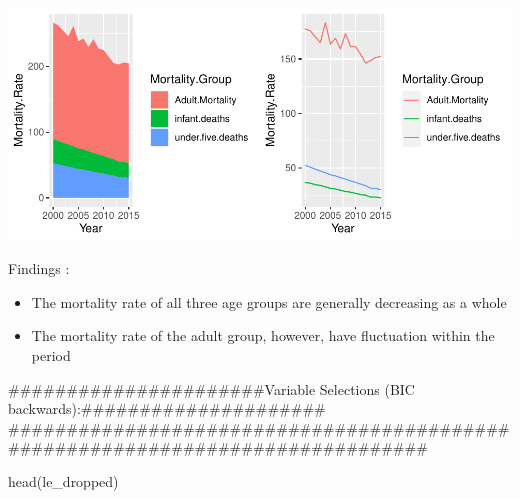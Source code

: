 \documentclass[
]{article}
\newenvironment{Shaded}{\begin{snugshade}}{\end{snugshade}}
\newcommand{\FunctionTok}[1]{\textcolor[rgb]{0.00,0.00,0.00}{#1}}
\newcommand{\NormalTok}[1]{#1}
\providecommand{\tightlist}{%
  \setlength{\itemsep}{0pt}\setlength{\parskip}{0pt}}
\begin{document}
\includegraphics{583Project_files/figure-latex/unnamed-chunk-13-1.pdf}

Findings :

\begin{itemize}
\tightlist
\item
  The mortality rate of all three age groups are generally decreasing as
  a whole
\item
  The mortality rate of the adult group, however, have fluctuation
  within the period
\end{itemize}

\#\#\#\#\#\#\#\#\#\#\#\#\#\#\#\#\#\#\#\#\#\#Variable Selections (BIC
backwards):\#\#\#\#\#\#\#\#\#\#\#\#\#\#\#\#\#\#\#\#\#
\#\#\#\#\#\#\#\#\#\#\#\#\#\#\#\#\#\#\#\#\#\#\#\#\#\#\#\#\#\#\#\#\#\#\#\#\#\#\#\#\#\#\#\#\#\#\#\#\#\#\#\#\#\#\#\#\#\#\#\#\#\#\#\#\#\#\#\#\#\#\#\#\#\#\#\#\#\#\#

\begin{Shaded}
\begin{Highlighting}[]
\FunctionTok{head}\NormalTok{(le\_dropped)}
\end{Highlighting}
\end{Shaded}
\end{document}
